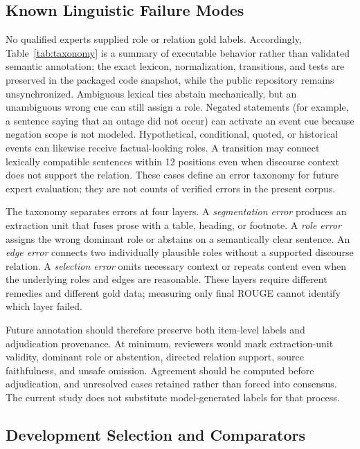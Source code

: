 \documentclass[applsci,article,submit,moreauthors]{Definitions/mdpi}
\begin{document}
\subsection{Known Linguistic Failure Modes}

No qualified experts supplied role or relation gold labels. Accordingly, Table~\ref{tab:taxonomy} is a summary of executable behavior rather than validated semantic annotation; the exact lexicon, normalization, transitions, and tests are preserved in the packaged code snapshot, while the public repository remains unsynchronized. Ambiguous lexical ties abstain mechanically, but an unambiguous wrong cue can still assign a role. Negated statements (for example, a sentence saying that an outage did not occur) can activate an event cue because negation scope is not modeled. Hypothetical, conditional, quoted, or historical events can likewise receive factual-looking roles. A transition may connect lexically compatible sentences within 12 positions even when discourse context does not support the relation. These cases define an error taxonomy for future expert evaluation; they are not counts of verified errors in the present corpus.

The taxonomy separates errors at four layers. A \textit{segmentation error} produces an extraction unit that fuses prose with a table, heading, or footnote. A \textit{role error} assigns the wrong dominant role or abstains on a semantically clear sentence. An \textit{edge error} connects two individually plausible roles without a supported discourse relation. A \textit{selection error} omits necessary context or repeats content even when the underlying roles and edges are reasonable. These layers require different remedies and different gold data; measuring only final ROUGE cannot identify which layer failed.

Future annotation should therefore preserve both item-level labels and adjudication provenance. At minimum, reviewers would mark extraction-unit validity, dominant role or abstention, directed relation support, source faithfulness, and unsafe omission. Agreement should be computed before adjudication, and unresolved cases retained rather than forced into consensus. The current study does not substitute model-generated labels for that process.

\subsection{Development Selection and Comparators}
\end{document}
